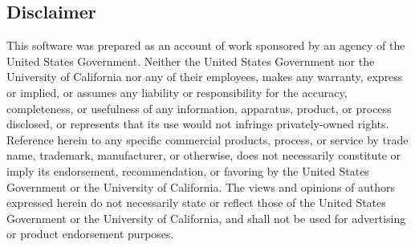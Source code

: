 \subsection*{Disclaimer}

This software was prepared as an account of work sponsored by an agency of the
United States Government. Neither the United States Government nor the
University of California nor any of their employees, makes any warranty,
express or implied, or assumes any liability or responsibility for the
accuracy, completeness, or usefulness of any information, apparatus, product,
or process disclosed, or represents that its use would not infringe
privately-owned rights. Reference herein to any specific commercial products,
process, or service by trade name, trademark, manufacturer, or otherwise, does
not necessarily constitute or imply its endorsement, recommendation, or
favoring by the United States Government or the University of California. The
views and opinions of authors expressed herein do not necessarily state or
reflect those of the United States Government or the University of California,
and shall not be used for advertising or product endorsement purposes.




